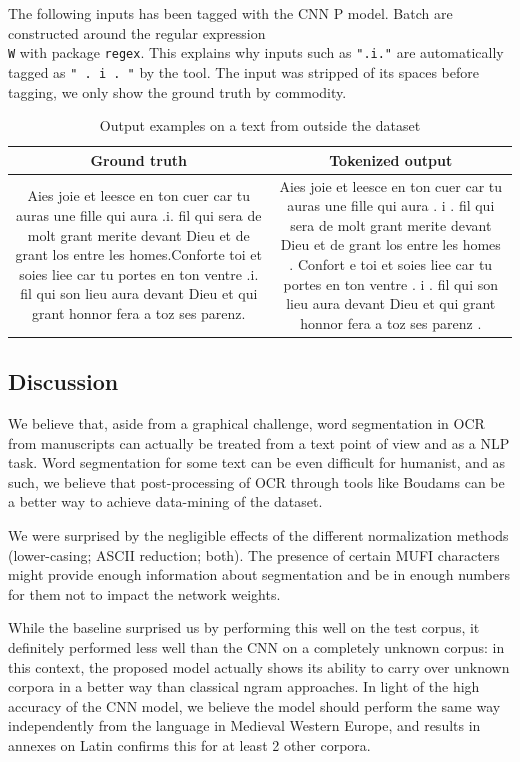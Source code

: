 \documentclass{jdmdh}
\begin{document}
The following inputs has been tagged with the CNN P model. Batch are constructed around the regular expression \texttt{\\W} with package \texttt{regex}. This explains why inputs such as \texttt{".i."} are automatically tagged as \texttt{" . i . "} by the tool. The input was stripped of its spaces before tagging, we only show the ground truth by commodity.

\begin{table}[!ht]
\centering
\begin{tabularx}{\textwidth}{|C|C|}
\hline
\textbf{Ground truth} & \textbf{Tokenized output} \\\hline
Aies joie et leesce en ton cuer car tu auras une fille qui aura .i. fil qui sera de molt grant merite devant Dieu et de grant los entre les homes.Conforte toi et soies liee car tu portes en ton ventre .i. fil qui son lieu aura devant Dieu et qui grant honnor fera a toz ses parenz. & Aies joie et leesce en ton cuer car tu auras une fille qui aura .  i .  fil qui sera de molt grant merite devant Dieu et de grant los entre les homes .  Confort e toi et soies liee car tu portes en ton ventre .  i .  fil qui son lieu aura devant Dieu et qui grant honnor fera a toz ses parenz .
\\\hline
\end{tabularx}
\caption{Output examples on a text from outside the dataset}
\label{tab:example_output}
\end{table}

\subsection{Discussion}

We believe that, aside from a graphical challenge, word segmentation in OCR from manuscripts can actually be treated from a text point of view and as a NLP task. Word segmentation for some text can be even difficult for humanist, and as such, we believe that post-processing of OCR through tools like Boudams can be a better way to achieve data-mining of the dataset.

We were surprised by the negligible effects of the different normalization methods (lower-casing; ASCII reduction; both). The presence of certain MUFI characters might provide enough information about segmentation and be in enough numbers for them not to impact the network weights.

While the baseline surprised us by performing this well on the test corpus, it definitely performed less well than the CNN on a completely unknown corpus: in this context, the proposed model actually shows its ability to carry over unknown corpora in a better way than classical ngram approaches. In light of the high accuracy of the CNN model, we believe the model should perform the same way independently from the language in Medieval Western Europe, and results in annexes on Latin confirms this for at least 2 other corpora.
\end{document}
